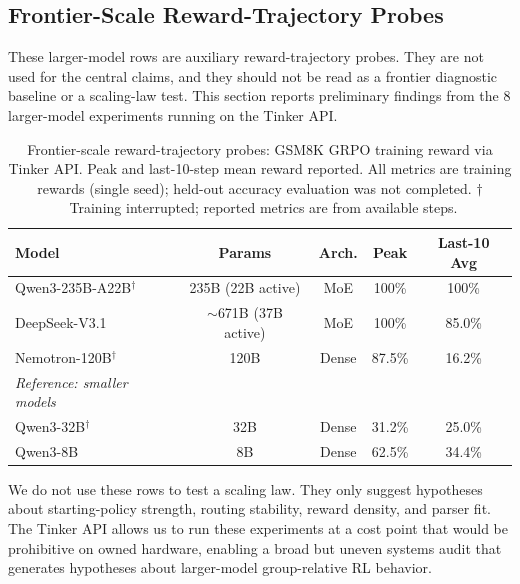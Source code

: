 \documentclass{article}
\begin{document}
\subsection{Frontier-Scale Reward-Trajectory Probes}
\label{sec:frontier}

These larger-model rows are auxiliary reward-trajectory probes.  They are not
used for the central claims, and they should not be read as a frontier
diagnostic baseline or a scaling-law test.  This section reports preliminary findings
from the 8 larger-model experiments running on the Tinker API.

\begin{table}[htbp]
\centering
\caption{Frontier-scale reward-trajectory probes: GSM8K GRPO training reward via Tinker API.
Peak and last-10-step mean reward reported. All metrics are training rewards
(single seed); held-out accuracy evaluation was not completed.
$\dagger$~Training interrupted; reported metrics are from available steps.}
\label{tab:frontier}
\begin{tabular}{lcccc}
\toprule
\textbf{Model} & \textbf{Params} & \textbf{Arch.} & \textbf{Peak} & \textbf{Last-10 Avg} \\
\midrule
Qwen3-235B-A22B$^\dagger$ & 235B (22B active) & MoE & 100\% & 100\% \\
DeepSeek-V3.1 & $\sim$671B (37B active) & MoE & 100\% & 85.0\% \\
Nemotron-120B$^\dagger$ & 120B & Dense & 87.5\% & 16.2\% \\
\midrule
\textit{Reference: smaller models} & & & & \\
Qwen3-32B$^\dagger$ & 32B & Dense & 31.2\% & 25.0\% \\
Qwen3-8B & 8B & Dense & 62.5\% & 34.4\% \\
\bottomrule
\end{tabular}
\end{table}

We do not use these rows to test a scaling law.  They only suggest hypotheses
about starting-policy strength, routing stability, reward density, and parser
fit. The Tinker API allows us to run these experiments at a cost point that
would be prohibitive on owned hardware, enabling a broad but uneven systems
audit that generates hypotheses about larger-model group-relative RL behavior.

\end{document}
